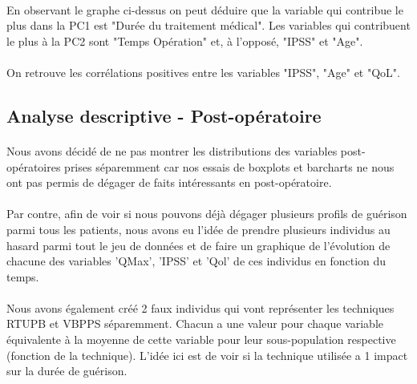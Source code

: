 \documentclass[11pt]{article}
\begin{document}
    \begin{center}
    \end{center}
    
    
    \begin{center}
    \end{center}
    
    
\paragraph{}
En observant le graphe ci-dessus on peut déduire que la variable qui
contribue le plus dans la PC1 est "Durée du traitement médical". Les
variables qui contribuent le plus à la PC2 sont "Temps Opération" et, à
l'opposé, "IPSS" et "Age".
\paragraph{}
On retrouve les corrélations positives entre les variables "IPSS", "Age"
et "QoL".

    \subsection{Analyse descriptive - Post-opératoire}\label{analyse-descriptive---post-opuxe9ratoire}
\paragraph{}
    Nous avons décidé de ne pas montrer les distributions des variables
post-opératoires prises séparemment car nos essais de boxplots et
barcharts ne nous ont pas permis de dégager de faits intéressants en
post-opératoire.
\paragraph{}
Par contre, afin de voir si nous pouvons déjà dégager plusieurs profils
de guérison parmi tous les patients, nous avons eu l'idée de prendre
plusieurs individus au hasard parmi tout le jeu de données et de faire
un graphique de l'évolution de chacune des variables 'QMax', 'IPSS' et
'Qol' de ces individus en fonction du temps.
\paragraph{}
Nous avons également créé 2 faux individus qui vont représenter les
techniques RTUPB et VBPPS séparemment. Chacun a une valeur pour chaque
variable équivalente à la moyenne de cette variable pour leur
sous-population respective (fonction de la technique). L'idée ici est de
voir si la technique utilisée a 1 impact sur la durée de guérison.
\end{document}
